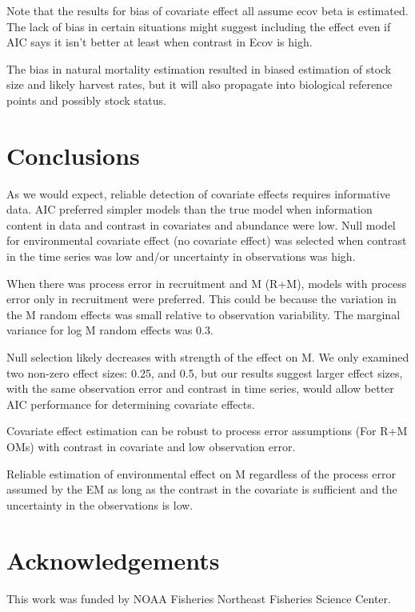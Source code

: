\documentclass[
  12pt,
]{article}
\newlength{\cslhangindent}
\newlength{\cslentryspacingunit} %
\newenvironment{CSLReferences}[2] %
 {%
  \setlength{\parindent}{0pt}
  \ifodd #1
  \let\oldpar\par
  \def\par{\hangindent=\cslhangindent\oldpar}
  \fi
  \setlength{\parskip}{#2\cslentryspacingunit}
 }%
 {}
\begin{document}
Note that the results for bias of covariate effect all assume ecov beta
is estimated. The lack of bias in certain situations might suggest
including the effect even if AIC says it isn't better at least when
contrast in Ecov is high.

The bias in natural mortality estimation resulted in biased estimation
of stock size and likely harvest rates, but it will also propagate into
biological reference points and possibly stock status.

\hypertarget{conclusions}{%
\section*{Conclusions}\label{conclusions}}

As we would expect, reliable detection of covariate effects requires
informative data. AIC preferred simpler models than the true model when
information content in data and contrast in covariates and abundance
were low. Null model for environmental covariate effect (no covariate
effect) was selected when contrast in the time series was low and/or
uncertainty in observations was high.

When there was process error in recruitment and M (R+M), models with
process error only in recruitment were preferred. This could be because
the variation in the M random effects was small relative to observation
variability. The marginal variance for log M random effects was 0.3.

Null selection likely decreases with strength of the effect on M. We
only examined two non-zero effect sizes: 0.25, and 0.5, but our results
suggest larger effect sizes, with the same observation error and
contrast in time series, would allow better AIC performance for
determining covariate effects.

Covariate effect estimation can be robust to process error assumptions
(For R+M OMs) with contrast in covariate and low observation error.

Reliable estimation of environmental effect on M regardless of the
process error assumed by the EM as long as the contrast in the covariate
is sufficient and the uncertainty in the observations is low.

\hypertarget{acknowledgements}{%
\section*{Acknowledgements}\label{acknowledgements}}

This work was funded by NOAA Fisheries Northeast Fisheries Science
Center.

\pagebreak



\hypertarget{refs}{}
\begin{CSLReferences}{0}{0}
\end{CSLReferences}

\pagebreak
\end{document}
